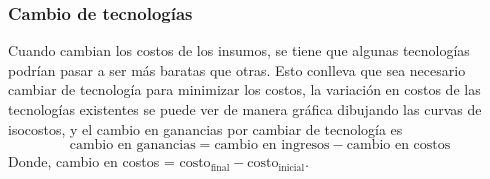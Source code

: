 \subsubsection{Cambio de tecnologías}
Cuando cambian los costos de los insumos, se tiene que algunas tecnologías podrían pasar a ser más baratas que otras. Esto conlleva que sea necesario cambiar de tecnología para minimizar los costos, la variación en costos de las tecnologías existentes se puede ver de manera gráfica dibujando las curvas de isocostos, y el cambio en ganancias por cambiar de tecnología es
\[\text{cambio en ganancias} = \text{cambio en ingresos} - \text{cambio en costos}\]
Donde, cambio en costos = $\text{costo}_{\text{final}} - \text{costo}_{\text{inicial}}$.
\newpage